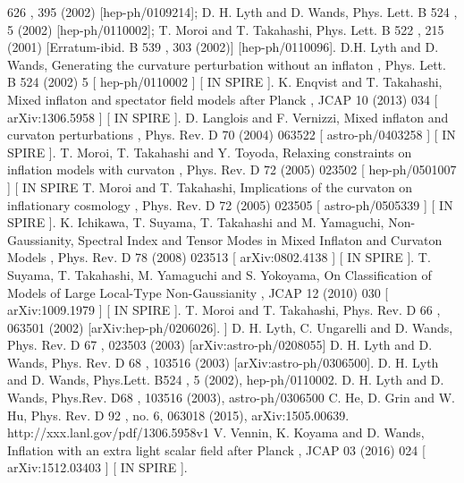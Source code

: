 \documentclass[amssymb,twocolumn,prd,nofootinbib,showpacs]{revtex4-1}
\begin{document}
\begin{thebibliography}{9}
626
,  395  (2002)  [hep-ph/0109214];
D. H. Lyth and D. Wands, Phys. Lett. B
524
, 5 (2002) [hep-ph/0110002]; T. Moroi
and T. Takahashi, Phys. Lett. B
522
, 215 (2001) [Erratum-ibid. B
539
, 303 (2002)]
[hep-ph/0110096].
D.H. Lyth and D. Wands,
Generating the curvature perturbation without an inflaton
,
Phys. Lett.
B 524
(2002) 5
[
hep-ph/0110002
] [
IN
SPIRE
].
 K. Enqvist and T. Takahashi,
Mixed inflaton and spectator field models after Planck
,
JCAP
10
(2013) 034 [
arXiv:1306.5958
] [
IN
SPIRE
].
 D. Langlois and F. Vernizzi,
Mixed inflaton and curvaton perturbations
,
Phys. Rev.
D 70
(2004) 063522
[
astro-ph/0403258
] [
IN
SPIRE
].
 T. Moroi, T. Takahashi and Y. Toyoda,
Relaxing constraints on inflation models with curvaton
,
Phys. Rev.
D 72
(2005) 023502
[
hep-ph/0501007
] [
IN
SPIRE
 T. Moroi and T. Takahashi,
Implications of the curvaton on inflationary cosmology
,
Phys. Rev.
D 72
(2005) 023505
[
astro-ph/0505339
] [
IN
SPIRE
].
 K. Ichikawa, T. Suyama, T. Takahashi and M. Yamaguchi,
Non-Gaussianity, Spectral Index
and Tensor Modes in Mixed Inflaton and Curvaton Models
,
Phys. Rev.
D 78
(2008) 023513
[
arXiv:0802.4138
] [
IN
SPIRE
].
T. Suyama, T. Takahashi, M. Yamaguchi and S. Yokoyama,
On Classification of Models of
Large Local-Type Non-Gaussianity
,
JCAP
12
(2010) 030
[
arXiv:1009.1979
] [
IN
SPIRE
].
T. Moroi and T. Takahashi, Phys. Rev. D
66
, 063501 (2002) [arXiv:hep-ph/0206026].
] D. H. Lyth, C. Ungarelli and D. Wands, Phys. Rev. D
67
, 023503 (2003)
[arXiv:astro-ph/0208055]
 D. H. Lyth and D. Wands, Phys. Rev. D
68
, 103516 (2003) [arXiv:astro-ph/0306500].
  D. H. Lyth and D. Wands, Phys.Lett.
B524
, 5 (2002),
hep-ph/0110002.
  D.  H.  Lyth  and  D.  Wands,  Phys.Rev.
D68
,  103516
(2003), astro-ph/0306500
 C.  He,  D.  Grin  and  W.  Hu,  Phys.  Rev.  D
92
,  no.  6,
063018 (2015), arXiv:1505.00639.
http://xxx.lanl.gov/pdf/1306.5958v1
 V. Vennin, K. Koyama and D. Wands,
Inflation with an extra light scalar field after Planck
,
JCAP
03
(2016) 024 [
arXiv:1512.03403
] [
IN
SPIRE
].
\end{thebibliography}
\end{document}
